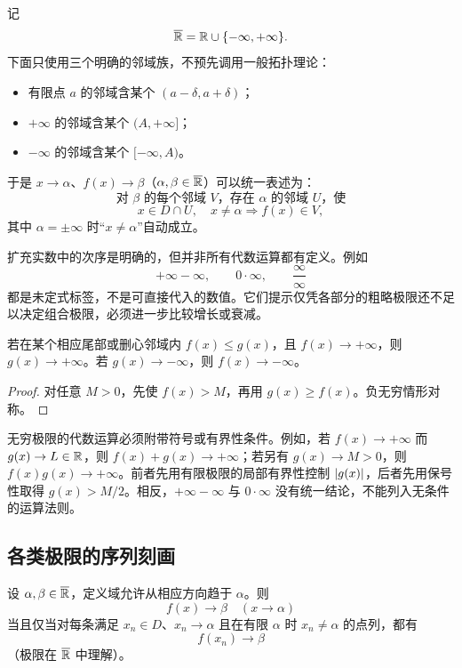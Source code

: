 记
\[
 \overline{\mathbb{R}}=\mathbb{R}\cup\{-\infty,+\infty\}.
\]
下面只使用三个明确的邻域族，不预先调用一般拓扑理论：
\begin{itemize}
 \item 有限点 \(a\) 的邻域含某个 \((a-\delta,a+\delta)\)；
 \item \(+\infty\) 的邻域含某个 \((A,+\infty]\)；
 \item \(-\infty\) 的邻域含某个 \([-\infty,A)\)。
\end{itemize}
于是 \(x\to\alpha\)、\(f(x)\to\beta\)（\(\alpha,\beta\in\overline{\mathbb{R}}\)）可以统一表述为：
\[
 \text{对 \(\beta\) 的每个邻域 \(V\)，存在 \(\alpha\) 的邻域 \(U\)，使}
\]
\[
 x\in D\cap U,\quad x\ne\alpha
 \Longrightarrow f(x)\in V,
\]
其中 \(\alpha=\pm\infty\) 时“\(x\ne\alpha\)”自动成立。

\begin{remark}[无穷运算的限制]
扩充实数中的次序是明确的，但并非所有代数运算都有定义。例如
\[
 +\infty-\infty,\qquad0\cdot\infty,\qquad\frac{\infty}{\infty}
\]
都是未定式标签，不是可直接代入的数值。它们提示仅凭各部分的粗略极限还不足以决定组合极限，必须进一步比较增长或衰减。
\end{remark}

\begin{proposition}[无穷极限的保序]
若在某个相应尾部或删心邻域内 \(f(x)\le g(x)\)，且 \(f(x)\to+\infty\)，则 \(g(x)\to+\infty\)。若 \(g(x)\to-\infty\)，则 \(f(x)\to-\infty\)。
\end{proposition}

\begin{proof}
对任意 \(M>0\)，先使 \(f(x)>M\)，再用 \(g(x)\ge f(x)\)。负无穷情形对称。
\end{proof}

无穷极限的代数运算必须附带符号或有界性条件。例如，若 \(f(x)\to+\infty\) 而 \(g(x)\to L\in\mathbb{R}\)，则 \(f(x)+g(x)\to+\infty\)；若另有 \(g(x)\to M>0\)，则 \(f(x)g(x)\to+\infty\)。前者先用有限极限的局部有界性控制 \(\left|g(x)\right|\)，后者先用保号性取得 \(g(x)>M/2\)。相反，\(+\infty-\infty\) 与 \(0\cdot\infty\) 没有统一结论，不能列入无条件的运算法则。

\subsection{各类极限的序列刻画}

\begin{theorem}[扩展 Heine 定理]
设 \(\alpha,\beta\in\overline{\mathbb{R}}\)，定义域允许从相应方向趋于 \(\alpha\)。则
\[
 f(x)\to\beta\quad(x\to\alpha)
\]
当且仅当对每条满足 \(x_n\in D\)、\(x_n\to\alpha\) 且在有限 \(\alpha\) 时 \(x_n\ne\alpha\) 的点列，都有
\[
 f(x_n)\to\beta
\]
（极限在 \(\overline{\mathbb{R}}\) 中理解）。
\end{theorem}

